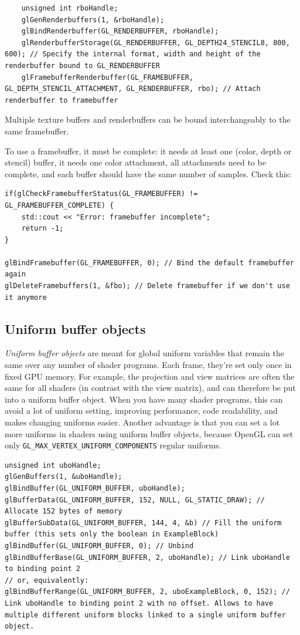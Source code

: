 \documentclass[table, xcdraw]{article}%
\begin{document}
\begin{itemize}
    \begin{verbatim}
    unsigned int rboHandle;
    glGenRenderbuffers(1, &rboHandle);
    glBindRenderbuffer(GL_RENDERBUFFER, rboHandle);
    glRenderbufferStorage(GL_RENDERBUFFER, GL_DEPTH24_STENCIL8, 800, 600); // Specify the internal format, width and height of the renderbuffer bound to GL_RENDERBUFFER
    glFramebufferRenderbuffer(GL_FRAMEBUFFER, GL_DEPTH_STENCIL_ATTACHMENT, GL_RENDERBUFFER, rbo); // Attach renderbuffer to framebuffer
    \end{verbatim}
\end{itemize}

Multiple texture buffers and renderbuffers can be bound interchangeably to the same framebuffer.

To use a framebuffer, it must be complete: it needs at least one (color, depth or stencil) buffer, it needs one color attachment, all attachments need to be complete, and each buffer should have the same number of samples. Check this:

\begin{verbatim}
if(glCheckFramebufferStatus(GL_FRAMEBUFFER) != GL_FRAMEBUFFER_COMPLETE) {
    std::cout << "Error: framebuffer incomplete";
    return -1;
}

glBindFramebuffer(GL_FRAMEBUFFER, 0); // Bind the default framebuffer again
glDeleteFramebuffers(1, &fbo); // Delete framebuffer if we don't use it anymore
\end{verbatim}

\subsection{Uniform buffer objects}

\emph{Uniform buffer objects} are meant for global uniform variables that remain the same over any number of shader programs. Each frame, they're set only once in fixed GPU memory. For example, the projection and view matrices are often the same for all shaders (in contrast with the view matrix), and can therefore be put into a uniform buffer object. When you have many shader programs, this can avoid a lot of uniform setting, improving performance, code readability, and makes changing uniforms easier. Another advantage is that you can set a lot more uniforms in shaders using uniform buffer objects, because OpenGL can set only \texttt{GL_MAX_VERTEX_UNIFORM_COMPONENTS} regular uniforms.

\begin{verbatim}
unsigned int uboHandle;
glGenBuffers(1, &uboHandle);
glBindBuffer(GL_UNIFORM_BUFFER, uboHandle);
glBufferData(GL_UNIFORM_BUFFER, 152, NULL, GL_STATIC_DRAW); // Allocate 152 bytes of memory
glBufferSubData(GL_UNIFORM_BUFFER, 144, 4, &b) // Fill the uniform buffer (this sets only the boolean in ExampleBlock)
glBindBuffer(GL_UNIFORM_BUFFER, 0); // Unbind
glBindBufferBase(GL_UNIFORM_BUFFER, 2, uboHandle); // Link uboHandle to binding point 2
// or, equivalently:
glBindBufferRange(GL_UNIFORM_BUFFER, 2, uboExampleBlock, 0, 152); // Link uboHandle to binding point 2 with no offset. Allows to have multiple different uniform blocks linked to a single uniform buffer object.
\end{verbatim}
\end{document}
